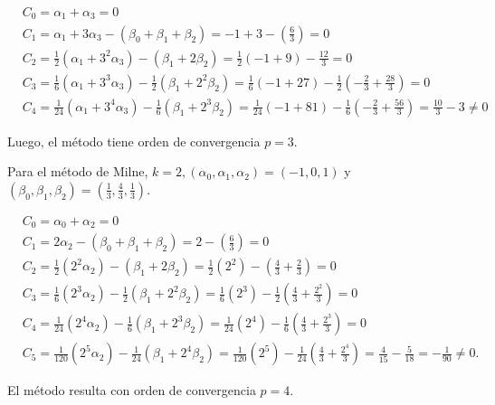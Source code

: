 \documentclass[10pt]{book}
\begin{document}
$$
\begin{aligned}
& C_{0}=\alpha_{1}+\alpha_{3}=0 \\
& C_{1}=\alpha_{1}+3 \alpha_{3}-\left(\beta_{0}+\beta_{1}+\beta_{2}\right)=-1+3-\left(\frac{6}{3}\right)=0 \\
& C_{2}=\frac{1}{2}\left(\alpha_{1}+3^{2} \alpha_{3}\right)-\left(\beta_{1}+2 \beta_{2}\right)=\frac{1}{2}(-1+9)-\frac{12}{3}=0 \\
& C_{3}=\frac{1}{6}\left(\alpha_{1}+3^{3} \alpha_{3}\right)-\frac{1}{2}\left(\beta_{1}+2^{2} \beta_{2}\right)=\frac{1}{6}(-1+27)-\frac{1}{2}\left(-\frac{2}{3}+\frac{28}{3}\right)=0 \\
& C_{4}=\frac{1}{24}\left(\alpha_{1}+3^{4} \alpha_{3}\right)-\frac{1}{6}\left(\beta_{1}+2^{3} \beta_{2}\right)=\frac{1}{24}(-1+81)-\frac{1}{6}\left(-\frac{2}{3}+\frac{56}{3}\right)=\frac{10}{3}-3 \neq 0
\end{aligned}
$$

Luego, el método tiene orden de convergencia $p=3$.

Para el método de Milne, $k=2,\left(\alpha_{0}, \alpha_{1}, \alpha_{2}\right)=(-1,0,1)$ y $\left(\beta_{0}, \beta_{1}, \beta_{2}\right)=\left(\frac{1}{3}, \frac{4}{3}, \frac{1}{3}\right)$.

$$
\begin{aligned}
& C_{0}=\alpha_{0}+\alpha_{2}=0 \\
& C_{1}=2 \alpha_{2}-\left(\beta_{0}+\beta_{1}+\beta_{2}\right)=2-\left(\frac{6}{3}\right)=0 \\
& C_{2}=\frac{1}{2}\left(2^{2} \alpha_{2}\right)-\left(\beta_{1}+2 \beta_{2}\right)=\frac{1}{2}\left(2^{2}\right)-\left(\frac{4}{3}+\frac{2}{3}\right)=0 \\
& C_{3}=\frac{1}{6}\left(2^{3} \alpha_{2}\right)-\frac{1}{2}\left(\beta_{1}+2^{2} \beta_{2}\right)=\frac{1}{6}\left(2^{3}\right)-\frac{1}{2}\left(\frac{4}{3}+\frac{2^{2}}{3}\right)=0 \\
& C_{4}=\frac{1}{24}\left(2^{4} \alpha_{2}\right)-\frac{1}{6}\left(\beta_{1}+2^{3} \beta_{2}\right)=\frac{1}{24}\left(2^{4}\right)-\frac{1}{6}\left(\frac{4}{3}+\frac{2^{3}}{3}\right)=0 \\
& C_{5}=\frac{1}{120}\left(2^{5} \alpha_{2}\right)-\frac{1}{24}\left(\beta_{1}+2^{4} \beta_{2}\right)=\frac{1}{120}\left(2^{5}\right)-\frac{1}{24}\left(\frac{4}{3}+\frac{2^{4}}{3}\right)=\frac{4}{15}-\frac{5}{18}=-\frac{1}{90} \neq 0 .
\end{aligned}
$$

El método resulta con orden de convergencia $p=4$.
\end{document}
